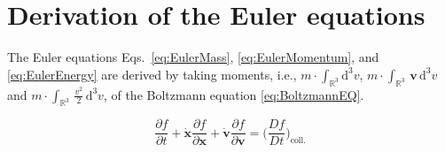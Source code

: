
\chapter{Derivation of the Euler equations} %

\label{AppendixA} %

The Euler equations Eqs.~\eqref{eq:EulerMass}, \eqref{eq:EulerMomentum}, and \eqref{eq:EulerEnergy} are derived by taking moments, i.e., $m\cdot\int_{\mathbb{R}^{3}} \mathrm{d}^{3}v$, $m\cdot\int_{\mathbb{R}^{3}}\,\textbf{v}\,\mathrm{d}^{3}v$ and $m\cdot\int_{\mathbb{R}^{3}}\,\frac{v^{2}}{2}\,\mathrm{d}^{3}v$, of the Boltzmann equation \eqref{eq:BoltzmannEQ}.

\begin{equation*}
  \frac{\partial f}{\partial t} + \dot{\textbf{x}} \frac{\partial f}{\partial \textbf{x}} + \dot{\textbf{v}} \frac{\partial f}{\partial \textbf{v}} = \Big(\frac{Df}{Dt}\Big)_{\text{coll.}}
\end{equation*}


